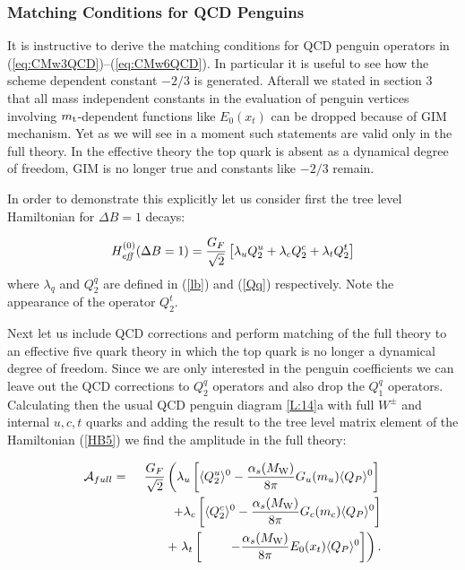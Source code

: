\documentclass[12pt]{article}
\def\as{\alpha_s}
\newcommand{\mt}{m_{\rm t}}
\newcommand{\mw}{M_{\rm W}}
\begin{document}
\begin{itemize}
\begin{itemize}
\subsubsection{Matching Conditions for QCD Penguins}
It is instructive to derive the matching conditions for 
QCD penguin operators in (\ref{eq:CMw3QCD})--(\ref{eq:CMw6QCD}). 
In particular it is useful to
see how the scheme dependent constant $-2/3$ is generated.
Afterall we stated in section 3 that all mass independent
constants in the evaluation of penguin vertices involving
$\mt$-dependent functions like $E_0(x_t)$ can be dropped
because of GIM mechanism. Yet as we will see in a moment
such statements are valid only  in the full theory. In the effective
theory the top quark is absent as a dynamical degree of freedom,
GIM is no longer true and constants like $-2/3$ remain. 

In order to demonstrate this explicitly let us consider first
the tree level Hamiltonian for $\Delta B=1$ decays:

\begin{equation}\label{HB5}
H^{(0)}_{\it eff}(\Delta B=1)=\frac{G_F}{\sqrt{2}}
\left[\lambda_u Q^u_2
+\lambda_c Q^c_2
+\lambda_t Q^t_2 \right]
\end{equation}
where $\lambda_q$ and $Q^q_2$  are defined in (\ref{lb}) and (\ref{Qq})
respectively. Note the appearance of the operator $Q^t_2$.

Next let us include QCD corrections and perform matching of the
full theory to an effective five quark theory in which the top
quark is no longer a dynamical degree of freedom. Since we are
only interested in the penguin coefficients we can leave out
the QCD corrections to $Q^q_2$ operators and also drop the
$Q^q_1$ operators. Calculating then the usual QCD penguin diagram
\ref{L:14}a
with full $W^\pm$ and internal $u,c,t$ quarks and adding the result
to the tree level matrix element of the Hamiltonian (\ref{HB5})
we find the amplitude in the full theory:

\begin{eqnarray}\label{AMPFULL} 
{\cal A}_{full} & = &
\frac{G_F}{\sqrt{2}} 
 \left( \lambda_u \left[\langle Q^u_2 \rangle^0  
 -\frac{\as(\mw)}{8\pi} G_u(m_u) \langle Q_P\rangle ^0\right] \right.
\nonumber\\ 
&& ~~~~~~~+ \lambda_c \left[\langle Q^c_2 \rangle^0  
 -\frac{\as(\mw)}{8\pi} G_c(m_c) \langle Q_P\rangle ^0\right] 
\nonumber\\ 
&& ~~~~~~~+ \left.\lambda_t 
\left[~~~~~~~-\frac{\as(\mw)}{8\pi} E_0(x_t) 
\langle Q_P\rangle ^0\right] \right).
\end{eqnarray} 


\end{itemize}
\end{itemize}
\end{document}
